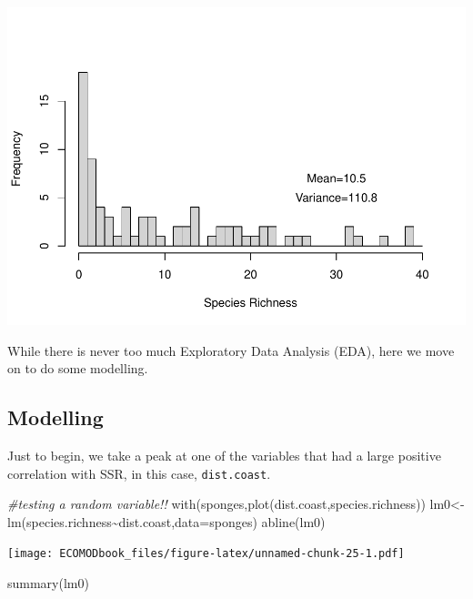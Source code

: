 \documentclass[
]{book}
\newenvironment{Shaded}{\begin{snugshade}}{\end{snugshade}}
\newcommand{\AttributeTok}[1]{\textcolor[rgb]{0.77,0.63,0.00}{#1}}
\newcommand{\CommentTok}[1]{\textcolor[rgb]{0.56,0.35,0.01}{\textit{#1}}}
\newcommand{\FunctionTok}[1]{\textcolor[rgb]{0.00,0.00,0.00}{#1}}
\newcommand{\NormalTok}[1]{#1}
\newcommand{\OtherTok}[1]{\textcolor[rgb]{0.56,0.35,0.01}{#1}}
\newcommand{\SpecialCharTok}[1]{\textcolor[rgb]{0.00,0.00,0.00}{#1}}
\begin{document}
\includegraphics{ECOMODbook_files/figure-latex/unnamed-chunk-24-1.pdf}

While there is never too much Exploratory Data Analysis (EDA), here we move on to do some modelling.

\hypertarget{modelling}{%
\subsection{Modelling}\label{modelling}}

Just to begin, we take a peak at one of the variables that had a large positive correlation with SSR, in this case, \texttt{dist.coast}.

\begin{Shaded}
\begin{Highlighting}[]
\CommentTok{\#testing a random variable!!}
\FunctionTok{with}\NormalTok{(sponges,}\FunctionTok{plot}\NormalTok{(dist.coast,species.richness))}
\NormalTok{lm0}\OtherTok{\textless{}{-}}\FunctionTok{lm}\NormalTok{(species.richness}\SpecialCharTok{\textasciitilde{}}\NormalTok{dist.coast,}\AttributeTok{data=}\NormalTok{sponges)}
\FunctionTok{abline}\NormalTok{(lm0)}
\end{Highlighting}
\end{Shaded}

\texttt{[image: ECOMODbook\_files/figure-latex/unnamed-chunk-25-1.pdf]}

\begin{Shaded}
\begin{Highlighting}[]
\FunctionTok{summary}\NormalTok{(lm0)}
\end{Highlighting}
\end{Shaded}
\end{document}
